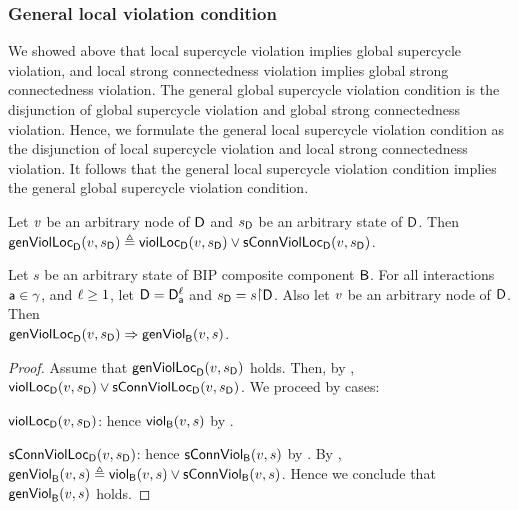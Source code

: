 \subsubsection{General local violation condition}

We showed above that local supercycle violation implies global supercycle violation, and local
strong connectedness violation implies global strong connectedness violation.  The general global
supercycle violation condition is the disjunction of global supercycle violation and global strong
connectedness violation.  Hence, we formulate the general local supercycle violation condition as the
disjunction of local supercycle violation and local strong connectedness violation.  It follows that
the general local supercycle violation condition implies the general global supercycle violation condition.


\begin{definition}
\label{def:locFormation.violation}
\label{defn:locFormation.violation}
Let $\mathit{v}$ be an arbitrary node of $\mathsf{D}$ and $s_\mathsf{D}$ be an arbitrary  state of $\mathsf{D}$.
Then $\mathsf{genViolLoc}_{\mathsf{D}}(v,s_\mathsf{D})  \triangleq \mathsf{violLoc}_{\mathsf{D}}(v,s_\mathsf{D}) \lor \mathsf{sConnViolLoc}_{\mathsf{D}}(v,s_\mathsf{D})$.
\end{definition}


\begin{proposition} \label{prop:locFromViol-implies-formViol}
\label{prop:locformviol-implies-formviol}
Let $s$ be an arbitrary state of BIP composite component $\mathsf{B}$.
For all interactions $\mathsf{a} \in \gamma$, and $\ell \ge 1$, let $\mathsf{D} = \mathsf{D}_{\mathsf{a}}^{\ell}$ and $\sD = s \pj \dsk{\act}{\l}$.
Also let $\mathit{v}$ be an arbitrary node of $\mathsf{D}$.
Then\\
\ind $ \mathsf{genViolLoc}_{\mathsf{D}}(v,s_\mathsf{D}) \Rightarrow \mathsf{genViol}_{\mathsf{B}}(v,s)$.
\end{proposition}
%
\begin{proof}
Assume that $\mathsf{genViolLoc}_{\mathsf{D}}(v,s_\mathsf{D})$ holds. Then, by ,
$\mathsf{violLoc}_{\mathsf{D}}(v,s_\mathsf{D}) \lor \mathsf{sConnViolLoc}_{\mathsf{D}}(v,s_\mathsf{D})$.
We proceed by cases:
\bn
\item $\mathsf{violLoc}_{\mathsf{D}}(v,s_\mathsf{D})$: hence $\mathsf{viol}_{\mathsf{B}}(v,s)$ by .
\item $\mathsf{sConnViolLoc}_{\mathsf{D}}(v,s_\mathsf{D})$: hence $\mathsf{sConnViol}_{\mathsf{B}}(v,s)$ by .
\en
By ,  $\mathsf{genViol}_{\mathsf{B}}(v,s)  \triangleq \mathsf{viol}_{\mathsf{B}}(v,s)  \lor \mathsf{sConnViol}_{\mathsf{B}}(v,s)$.
Hence we conclude that $\mathsf{genViol}_{\mathsf{B}}(v,s)$ holds.
\end{proof}




